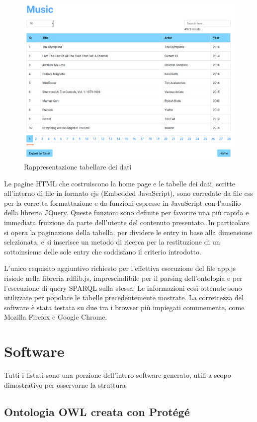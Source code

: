 \documentclass[Lau,binding=0.6cm,noexaminfo,oneside]{sapthesis}
\newcommand{\insertcode}[1]{}
\begin{document}
\begin{figure}[!htb]
  \centering
  \includegraphics[scale=0.34]{music.png}
  \caption{Rappresentazione tabellare dei dati}
\end{figure}

Le pagine HTML che costruiscono la home page e le tabelle dei dati, scritte all'interno di file in formato ejs (Embedded JavaScript), sono corredate da file css per la corretta formattazione e da funzioni espresse in JavaScript con l'ausilio della libreria JQuery. Queste funzioni sono definite per favorire una più rapida e immediata fruizione da parte dell'utente del contenuto presentato. In particolare si opera la paginazione della tabella, per dividere le entry in base alla dimensione selezionata, e si inserisce un metodo di ricerca per la restituzione di un sottoinsieme delle sole entry che soddisfano il criterio introdotto.\medskip

L'unico requisito aggiuntivo richiesto per l'effettiva esecuzione del file app.js risiede nella libreria rdflib.js, imprescindibile per il parsing dell'ontologia e per l'esecuzione di query SPARQL sulla stessa. Le informazioni così ottenute sono utilizzate per popolare le tabelle precedentemente mostrate. La correttezza del software è stata testata su due tra i browser più impiegati comunemente, come Mozilla Firefox e Google Chrome.

\appendix
\chapter{Software}
Tutti i listati sono una porzione dell'intero software generato, utili a scopo dimostrativo per osservarne la struttura

\section*{Ontologia OWL creata con Protégé}
\lstset{language=XML}
\insertcode{myontology.owl}

\backmatter
\clearpage
{}


\end{document}
